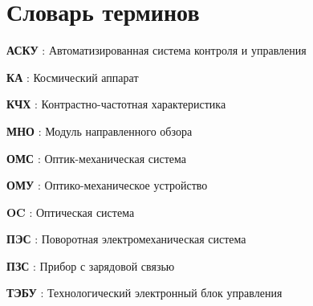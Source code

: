 \chapter*{Словарь терминов}             %



\textbf{АСКУ} : Автоматизированная система контроля и управления

\textbf {КА} : Космический аппарат

\textbf {КЧХ} : Контрастно-частотная характеристика

\textbf {МНО} : Модуль направленного обзора

\textbf {ОМС} : Оптик-механическая система

\textbf {ОМУ} : Оптико-механическое  устройство

\textbf {OC} : Оптическая система

\textbf {ПЭС} : Поворотная электромеханическая система

\textbf {ПЗС} : Прибор с зарядовой связью

\textbf {ТЭБУ} : Технологический электронный блок управления 



